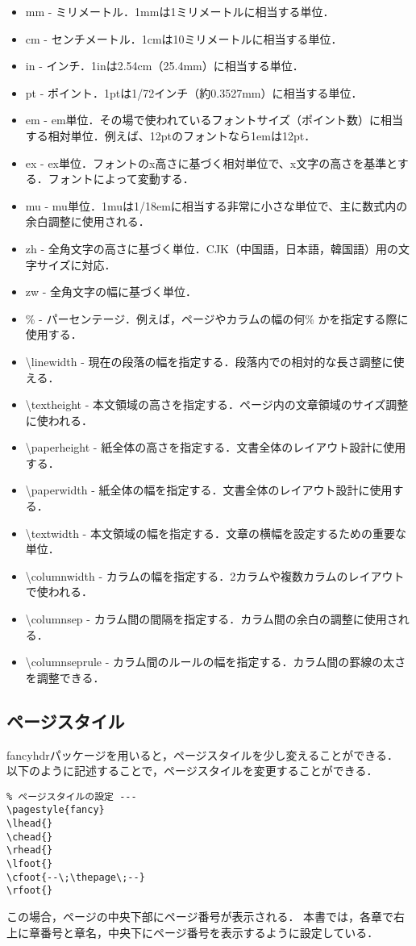 \begin{itemize}
  \item mm - ミリメートル．1mmは1ミリメートルに相当する単位． 
  \item cm - センチメートル．1cmは10ミリメートルに相当する単位．
  \item in - インチ．1inは2.54cm（25.4mm）に相当する単位．
  \item pt - ポイント．1ptは1/72インチ（約0.3527mm）に相当する単位．
  \item em - em単位．その場で使われているフォントサイズ（ポイント数）に相当する相対単位．例えば、12ptのフォントなら1emは12pt． 
  \item ex - ex単位．フォントのx高さに基づく相対単位で、x文字の高さを基準とする．フォントによって変動する． 
  \item mu - mu単位．1muは1/18emに相当する非常に小さな単位で、主に数式内の余白調整に使用される． 
  \item zh - 全角文字の高さに基づく単位．CJK（中国語，日本語，韓国語）用の文字サイズに対応． 
  \item zw - 全角文字の幅に基づく単位．
  \item \% - パーセンテージ．例えば，ページやカラムの幅の何\% かを指定する際に使用する．
  \item \textbackslash linewidth - 現在の段落の幅を指定する．段落内での相対的な長さ調整に使える． 
  \item \textbackslash textheight - 本文領域の高さを指定する．ページ内の文章領域のサイズ調整に使われる． 
  \item \textbackslash paperheight - 紙全体の高さを指定する．文書全体のレイアウト設計に使用する． 
  \item \textbackslash paperwidth - 紙全体の幅を指定する．文書全体のレイアウト設計に使用する． 
  \item \textbackslash textwidth - 本文領域の幅を指定する．文章の横幅を設定するための重要な単位． 
  \item \textbackslash columnwidth - カラムの幅を指定する．2カラムや複数カラムのレイアウトで使われる． 
  \item \textbackslash columnsep - カラム間の間隔を指定する．カラム間の余白の調整に使用される． 
  \item \textbackslash columnseprule - カラム間のルールの幅を指定する．カラム間の罫線の太さを調整できる．
\end{itemize}
\subsection{ページスタイル}
fancyhdrパッケージを用いると，ページスタイルを少し変えることができる．
以下のように記述することで，ページスタイルを変更することができる．
\begin{lstlisting}
% ページスタイルの設定 ---
\pagestyle{fancy}
\lhead{}
\chead{}
\rhead{}
\lfoot{}
\cfoot{--\;\thepage\;--}
\rfoot{}
\end{lstlisting}
この場合，ページの中央下部にページ番号が表示される．
本書では，各章で右上に章番号と章名，中央下にページ番号を表示するように設定している．
